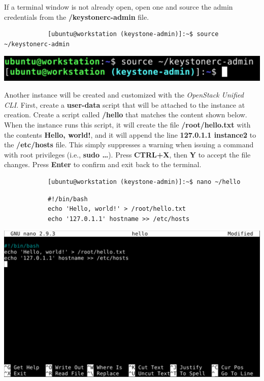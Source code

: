 \documentclass[letterpaper, 12pt]{article}
\begin{document}
\begin{enumerate}
    \begin{labstep}
        If a terminal window is not already open, open one and source the admin credentials from the \textbf{\texttildemid/keystonerc-admin} file.
        \begin{lstlisting}
            [ubuntu@workstation (keystone-admin)]:~$ source ~/keystonerc-admin
        \end{lstlisting}

        \begin{center}
            \includegraphics[width=\linewidth]{images/part3/step1.png}
        \end{center}
    \end{labstep}

    \begin{labstep}
        Another instance will be created and customized with the \textit{OpenStack Unified CLI}.
        First, create a \textbf{user-data} script that will be attached to the instance at creation.
        Create a script called \textbf{\texttildemid/hello} that matches the content shown below.
        When the instance runs this script, it will create the file \textbf{/root/hello.txt} with the contents \textbf{Hello, world!}, and it will append the line \textbf{127.0.1.1 instance2} to the \textbf{/etc/hosts} file.
        This simply suppresses a warning when issuing a command with root privileges (i.e., \textbf{sudo …}).
        Press \textbf{CTRL+X}, then \textbf{Y} to accept the file changes.
        Press \textbf{Enter} to confirm and exit back to the terminal.
        \begin{lstlisting}
            [ubuntu@workstation (keystone-admin)]:~$ nano ~/hello
        \end{lstlisting}
        \begin{lstlisting}
            #!/bin/bash
            echo 'Hello, world!' > /root/hello.txt
            echo '127.0.1.1' hostname >> /etc/hosts
        \end{lstlisting}

        \begin{center}
            \includegraphics[width=\linewidth]{images/part3/step2.png}
        \end{center}
    \end{labstep}


\end{enumerate}
\end{document}
